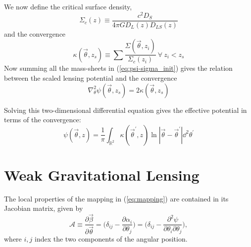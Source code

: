 We now define the critical surface density,
\begin{equation}
  \Sigma_{c}(z) \equiv\frac{c^2 D_S}{4\pi G D_L(z) D_{LS}(z)}
\end{equation}
and the convergence
\begin{equation}
  \label{eq:kappa-sigma}
  \kappa(\vec{\theta},z_s) \equiv \sum \frac{\Sigma(\vec{\theta},z_i)}{\Sigma_c(z_i)}\ \forall\ z_i < z_s
\end{equation}
Now summing all the mass-sheets in (\ref{eq:psi-sigma_init}) gives the relation between the scaled lensing potential and the convergence
\begin{equation}
  \label{eq:psi-kappa-1}
  \nabla_\theta^2\psi(\vec{\theta},z_s) = 2\kappa(\vec{\theta},z_s)
\end{equation}

Solving this two-dimensional differential equation gives the effective potential in terms of the convergence:
\begin{equation}
  \label{eq:psi-kappa}
  \psi(\vec{\theta},z) 
  = \frac{1}{\pi}\int_{\mathbb{R}^2} \kappa(\vec{\theta}^\prime,z) 
  \ln|\vec{\theta} - \vec{\theta}^\prime|\dd^2\theta^\prime
\end{equation}

\section{Weak Gravitational Lensing}
\label{sec:weak_lensing_intro}

The local properties of the mapping in (\ref{eq:mapping}) are contained in its Jacobian matrix, given by
\begin{equation}
  \label{eq:Jacobian_def}
  \mathcal{A} \equiv \frac{\partial \vec{\beta}}{\partial \vec{\theta}} = \Big(\delta_{ij} - \frac{\partial \alpha_i}{\partial \theta_j} \Big) = \Big(\delta_{ij} - \frac{\partial^2 \psi}{\partial \theta_i \partial \theta_j} \Big),
\end{equation}
where $i,j$ index the two components of the angular position.

